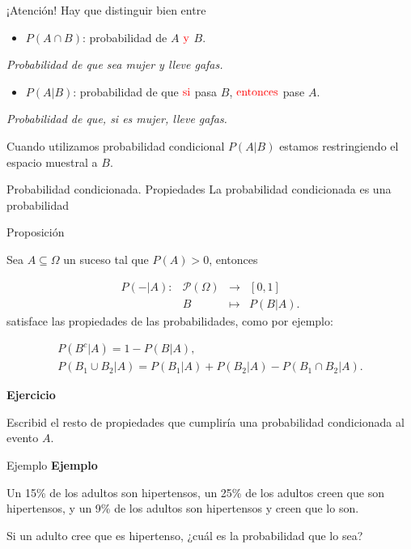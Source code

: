 \documentclass[
  ignorenonframetext,
  aspectratio=169]{beamer}
\providecommand{\tightlist}{%
  \setlength{\itemsep}{0pt}\setlength{\parskip}{0pt}}\usepackage{longtable,booktabs,array}
\begin{document}
\begin{frame}{¡Atención!}
\label{atenciuxf3n}
Hay que distinguir bien entre

\begin{itemize}
\tightlist
\item
  \(P(A\cap B)\): probabilidad de \(A\) \(\color{red}{\text{y}}\) \(B\).
\end{itemize}

\emph{Probabilidad de que sea mujer y lleve gafas.}

\begin{itemize}
\tightlist
\item
  \(P(A|B)\): probabilidad de que \(\color{red}{\text{si}}\) pasa \(B\),
  \(\color{red}{\text{entonces}}\) pase \(A\).
\end{itemize}

\emph{Probabilidad de que, si es mujer, lleve gafas.}

Cuando utilizamos probabilidad condicional \(P(A|B)\) estamos
restringiendo el espacio muestral a \(B\).
\end{frame}

\begin{frame}{Probabilidad condicionada. Propiedades}
\label{probabilidad-condicionada.-propiedades}
La probabilidad condicionada es una probabilidad

Proposición

Sea \(A\subseteq \Omega\) un suceso tal que \(P(A)>0\), entonces

\[
\begin{array}{rccl}
P(-|A):& \mathcal{P}(\Omega) & \to & [0,1]\\
&B & \mapsto & P(B|A).
\end{array}
\] satisface las propiedades de las probabilidades, como por ejemplo:

\[
\begin{array}{l}
P(B^c|A)=1-P(B|A),\\
P(B_1\cup B_2|A)=P(B_1|A)+P(B_2|A)-P(B_1\cap B_2|A).
\end{array}
\]

\textbf{Ejercicio}

Escribid el resto de propiedades que cumpliría una probabilidad
condicionada al evento \(A\).
\end{frame}

\begin{frame}{Ejemplo}
\label{ejemplo-1}
\textbf{Ejemplo}

Un 15\% de los adultos son hipertensos, un 25\% de los adultos creen que
son hipertensos, y un 9\% de los adultos son hipertensos y creen que lo
son.

Si un adulto cree que es hipertenso, ¿cuál es la probabilidad que lo
sea?
\end{frame}
\end{document}
